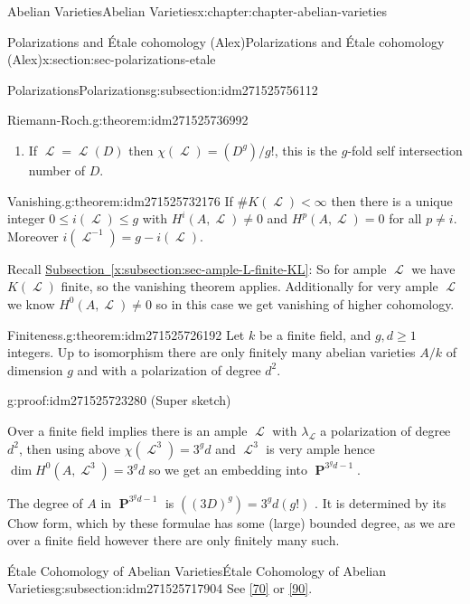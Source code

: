 \documentclass[oneside,10pt,]{book}
\numberwithin{equation}{section}
\newcommand{\sheaf}[1]{\operatorname{\mathcal{#1}}}
\DeclareMathOperator{\PP}{\mathbf{P}}
\newcommand{\lt}{<}
\begin{document}
\begin{chapterptx}{Abelian Varieties}{}{Abelian Varieties}{}{}{x:chapter:chapter-abelian-varieties}
\begin{sectionptx}{Polarizations and Étale cohomology (Alex)}{}{Polarizations and Étale cohomology (Alex)}{}{}{x:section:sec-polarizations-etale}
\begin{subsectionptx}{Polarizations}{}{Polarizations}{}{}{g:subsection:idm271525756112}
\begin{theorem}{Riemann-Roch.}{}{g:theorem:idm271525736992}
\begin{enumerate}
\item{}If \(\sheaf L = \sheaf L(D)\) then \(\chi(\sheaf L) = (D^g)/g!\), this is the \(g\)-fold self intersection number of \(D\).%
\end{enumerate}
%
\end{theorem}
\begin{theorem}{Vanishing.}{}{g:theorem:idm271525732176}%
If \(\#K( \sheaf L)\lt \infty\) then there is a unique integer \(0\le i(\sheaf L) \le g\) with \(H^i(A, \sheaf L) \ne  0\) and \(H^p(A, \sheaf L) = 0\) for all \(p \ne i\). Moreover \(i(\sheaf L^{-1}) = g - i(\sheaf L)\).%
\end{theorem}
Recall \hyperref[x:subsection:sec-ample-L-finite-KL]{Subsection~\ref{x:subsection:sec-ample-L-finite-KL}}: So for ample \(\sheaf L\) we have \(K(\sheaf L)\) finite, so the vanishing theorem applies. Additionally for very ample \(\sheaf L\) we know \(H^0(A,\sheaf L) \ne 0\) so in this case we get vanishing of higher cohomology.%
\begin{theorem}{Finiteness.}{}{g:theorem:idm271525726192}%
Let \(k\) be a finite field, and   \(g,d\ge 1\) integers. Up to isomorphism there are only finitely many abelian varieties \(A/k\) of dimension \(g\) and with a polarization of degree \(d^2\).%
\end{theorem}
\begin{proofptx}{}{g:proof:idm271525723280}
(Super sketch)%
\par
Over a finite field implies there is an ample \(\sheaf L\) with \(\lambda_{\sheaf L}\) a polarization of degree \(d^2\), then using above \(\chi(\sheaf L^3) = 3^g d\) and \(\sheaf L^3\) is very ample hence \(\dim H^0(A, \sheaf L^3) = 3^g d\) so we get an embedding into \(\PP^{3^g d - 1}\).%
\par
The degree of \(A\) in \(\PP^{3^g d - 1}\) is \(((3D)^g) = 3^g d(g!)\) . It is determined by its Chow form, which by these formulae has some (large) bounded degree, as we are over a finite field however there are only finitely many such.%
\end{proofptx}
\end{subsectionptx}
%
%
\typeout{************************************************}
\typeout{************************************************}
%
\begin{subsectionptx}{Étale Cohomology of Abelian Varieties}{}{Étale Cohomology of Abelian Varieties}{}{}{g:subsection:idm271525717904}
See \hyperlink{x:biblio:bib-milne-etale}{[70]} or \hyperlink{x:biblio:bib-tamme}{[90]}.%

\end{subsectionptx}
\end{sectionptx}
\end{chapterptx}
\end{document}
